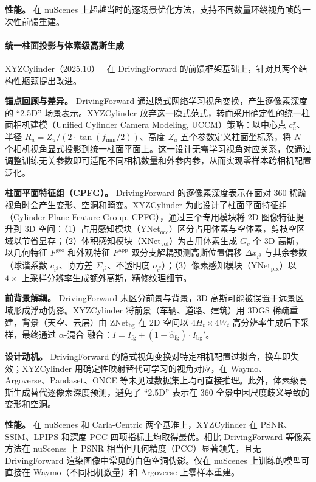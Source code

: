 \textbf{性能。} 在 nuScenes 上超越当时的逐场景优化方法，支持不同数量环绕视角帧的一次性前馈重建。

\paragraph{统一柱面投影与体素级高斯生成}

XYZCylinder（2025.10）~\cite{2510_07856} 在 DrivingForward 的前馈框架基础上，针对其两个结构性瓶颈提出改进。

\textbf{锚点回顾与差异。} DrivingForward 通过隐式网络学习视角变换，产生逐像素深度的 ``2.5D'' 场景表示。XYZCylinder 放弃这一隐式范式，转而采用确定性的统一柱面相机建模（Unified Cylinder Camera Modeling, UCCM）策略：以中心点 $c_u^x$、半径 $R_u = Z_u / (2 \cdot \tan(f_{\min}/2))$、高度 $Z_u$ 五个参数定义柱面坐标系，将 $N$ 个相机视角显式投影到统一柱面平面上。这一设计无需学习视角对应关系，仅通过调整训练无关参数即可适配不同相机数量和外参内参，从而实现零样本跨相机配置泛化。

\textbf{柱面平面特征组（CPFG）。} DrivingForward 的逐像素深度表示在面对 360\textdegree{} 稀疏视角时会产生变形、空洞和畸变。XYZCylinder 为此设计了柱面平面特征组（Cylinder Plane Feature Group, CPFG），通过三个专用模块将 2D 图像特征提升到 3D 空间：（1）占用感知模块（YNet$_\text{occ}$）区分占用体素与空体素，剪枝空区域以节省显存；（2）体积感知模块（XNet$_\text{vol}$）为占用体素生成 $G_v$ 个 3D 高斯，以几何特征 $F^\text{geo}$ 和外观特征 $F^\text{app}$ 双分支解耦预测高斯位置偏移 $\Delta x_{i^g}$ 与其余参数（球谐系数 $c_{i^g}$、协方差 $\Sigma_{i^g}$、不透明度 $o_{i^g}$）；（3）像素感知模块（YNet$_\text{pix}$）以 $4\times$ 上采样分辨率生成额外高斯，精修纹理细节。

\textbf{前背景解耦。} DrivingForward 未区分前景与背景，3D 高斯可能被误置于远景区域形成浮动伪影。XYZCylinder 将前景（车辆、道路、建筑）用 3DGS 稀疏重建，背景（天空、云层）由 ZNet$_\text{bg}$ 在 2D 空间以 $4H_t \times 4W_t$ 高分辨率生成后下采样，最终通过 $\alpha$-混合 融合：$I = I_\text{fg} + (1 - \hat{\alpha}_\text{fg}) \cdot I_\text{bg}'$。

\textbf{设计动机。} DrivingForward 的隐式视角变换对特定相机配置过拟合，换车即失效；XYZCylinder 用确定性映射替代可学习的视角对应，在 Waymo、Argoverse、Pandaset、ONCE 等未见过数据集上均可直接推理。此外，体素级高斯生成替代逐像素深度预测，避免了 ``2.5D'' 表示在 360\textdegree{} 全景中因尺度歧义导致的变形和空洞。

\textbf{性能。} 在 nuScenes 和 Carla-Centric 两个基准上，XYZCylinder 在 PSNR、SSIM、LPIPS 和深度 PCC 四项指标上均取得最优。相比 DrivingForward 等像素方法在 nuScenes 上 PSNR 相当但几何精度（PCC）显著领先，且无 DrivingForward 渲染图像中常见的白色空洞伪影。仅在 nuScenes 上训练的模型可直接在 Waymo（不同相机数量）和 Argoverse 上零样本重建。

